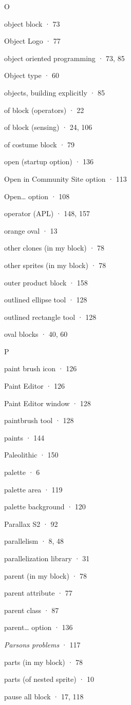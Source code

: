 O

object block · 73

Object Logo · 77

object oriented programming · 73, 85

Object type · 60

objects, building explicitly · 85

of block (operators) · 22

of block (sensing) · 24, 106

of costume block · 79

open (startup option) · 136

Open in Community Site option · 113

Open\ldots{} option · 108

operator (APL) · 148, 157

orange oval · 13

other clones (in my block) · 78

other sprites (in my block) · 78

outer product block · 158

outlined ellipse tool · 128

outlined rectangle tool · 128

oval blocks · 40, 60

P

paint brush icon · 126

Paint Editor · 126

Paint Editor window · 128

paintbrush tool · 128

paints · 144

Paleolithic · 150

palette · 6

palette area · 119

palette background · 120

Parallax S2 · 92

parallelism · 8, 48

parallelization library · 31

parent (in my block) · 78

parent attribute · 77

parent class · 87

parent\ldots{} option · 136

\emph{Parsons problems} · 117

parts (in my block) · 78

parts (of nested sprite) · 10

pause all block · 17, 118

